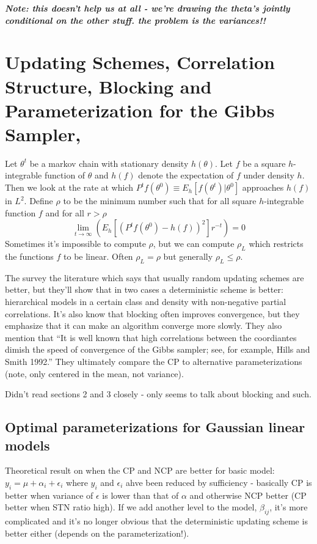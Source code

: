 \documentclass{article}\usepackage[]{graphicx}\usepackage[]{color}
\begin{document}
{\it\bf Note: this doesn't help us at all - we're drawing the theta's jointly conditional on the other stuff. the problem is the variances!!}

\section{Updating Schemes, Correlation Structure, Blocking and Parameterization for the Gibbs Sampler, \citet{roberts1997updating}}

Let $\theta^t$ be a markov chain with stationary density $h(\theta)$. Let $f$ be a square $h$-integrable function of $\theta$ and $h(f)$ denote the expectation of $f$ under density $h$. Then we look at the rate at which $P^tf(\theta^0) \equiv E_h[f(\theta^t)|\theta^0]$ approaches $h(f)$ in $L^2$. Define $\rho$ to be the minimum number such that for all square $h$-integrable function $f$ and for all $r>\rho$
\[
\lim_{t\to \infty}\left(E_h[(P^tf(\theta^0)-h(f))^2]r^{-t}\right)=0
\]
Sometimes it's impossible to compute $\rho$, but we can compute $\rho_L$ which restricts the functions $f$ to be linear. Often $\rho_L=\rho$ but generally $\rho_L\leq \rho$.

The survey the literature which says that usually random updating schemes are better, but they'll show that in two cases a deterministic scheme is better: hierarchical models in a certain class and density with non-negative partial correlations. It's also know that blocking often improves convergence, but they emphasize that it can make an algorithm converge more slowly. They also mention that ``It is well known that high correlations between the coordiantes dimish the speed of convergence of the Gibbs sampler; see, for example, Hills and Smith 1992.'' They ultimately compare the CP to alternative parameterizations (note, only centered in the mean, not variance).

Didn't read sections 2 and 3 closely - only seems to talk about blocking and such.

\subsection{Optimal parameterizations for Gaussian linear models}
Theoretical result on when the CP and NCP are better for basic model: $y_i = \mu + \alpha_i + \epsilon_i$ where $y_i$ and $\epsilon_i$ ahve been reduced by sufficiency - basically CP is better when variance of $\epsilon$ is lower than that of $\alpha$ and otherwise NCP better (CP better when STN ratio high).
If we add another level to the model, $\beta_{ij}$, it's more complicated and it's no longer obvious that the deterministic updating scheme is better either (depends on the parameterization!).
\end{document}
